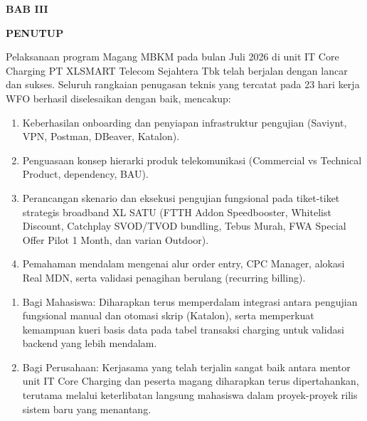 \documentclass[12pt,a4paper]{article}
\begin{document}
\clearpage
\begin{center}
    {\bfseries\large BAB III\par}
    {\bfseries\large PENUTUP\par}
\end{center}
\vspace{0.3cm}

\vspace{0.2cm}
Pelaksanaan program Magang MBKM pada bulan Juli 2026 di unit IT Core Charging PT XLSMART Telecom Sejahtera Tbk telah berjalan dengan lancar dan sukses. Seluruh rangkaian penugasan teknis yang tercatat pada 23 hari kerja WFO berhasil diselesaikan dengan baik, mencakup:
\begin{enumerate}[label=\arabic*.,leftmargin=1.5em,itemsep=2pt,topsep=2pt]
    \item Keberhasilan onboarding dan penyiapan infrastruktur pengujian (Saviynt, VPN, Postman, DBeaver, Katalon).
    \item Penguasaan konsep hierarki produk telekomunikasi (Commercial vs Technical Product, dependency, BAU).
    \item Perancangan skenario dan eksekusi pengujian fungsional pada tiket-tiket strategis broadband XL SATU (FTTH Addon Speedbooster, Whitelist Discount, Catchplay SVOD/TVOD bundling, Tebus Murah, FWA Special Offer Pilot 1 Month, dan varian Outdoor).
    \item Pemahaman mendalam mengenai alur order entry, CPC Manager, alokasi Real MDN, serta validasi penagihan berulang (recurring billing).
\end{enumerate}

\vspace{0.4cm}
\vspace{0.2cm}
\begin{enumerate}[label=\arabic*.,leftmargin=1.5em,itemsep=2pt,topsep=2pt]
    \item Bagi Mahasiswa: Diharapkan terus memperdalam integrasi antara pengujian fungsional manual dan otomasi skrip (Katalon), serta memperkuat kemampuan kueri basis data pada tabel transaksi charging untuk validasi backend yang lebih mendalam.
    \item Bagi Perusahaan: Kerjasama yang telah terjalin sangat baik antara mentor unit IT Core Charging dan peserta magang diharapkan terus dipertahankan, terutama melalui keterlibatan langsung mahasiswa dalam proyek-proyek rilis sistem baru yang menantang.
\end{enumerate}
\end{document}
